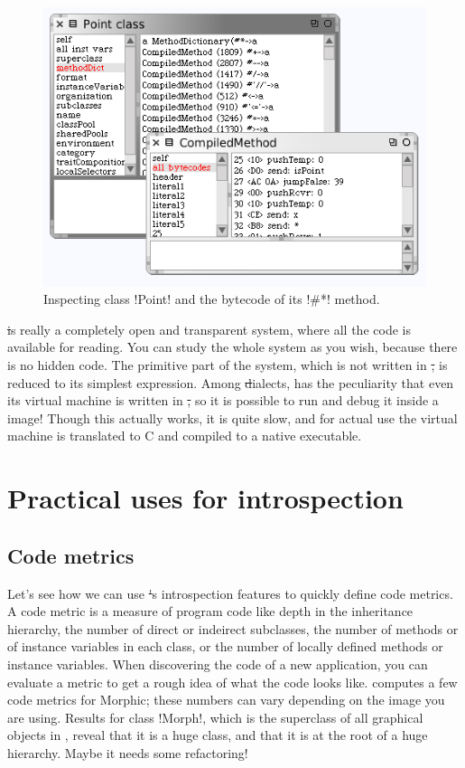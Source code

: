 \documentclass[a4paper,10pt,twoside]{book}
\begin{document}
\begin{figure}[ht]\centering
	\includegraphics[width=.75\linewidth]{CompiledMethod}
	\caption{Inspecting class \ct!Point! and the bytecode of its \ct!\#*! method.\label{fig:CompiledMethod}}
\end{figure}

\st is really a completely open and transparent system, where all the code is available for reading.
You can study the whole system as you wish, because there is no hidden code.
The primitive part of the system, \ie which is not written in \st, is reduced to its simplest expression.
Among \st dialects, \squeak has the peculiarity that even its virtual machine is written in \st, so it is possible to run and debug it inside a \squeak image!
Though this actually works, it is quite slow, and for actual use the virtual machine is translated to C and compiled to a native executable.


\section{Practical uses for introspection} %

\subsection{Code metrics}

Let's see how we can use \st's introspection features to quickly define code metrics.
A code metric is a measure of program code like depth in the inheritance hierarchy, the number of direct or indeirect subclasses, the number of methods or of instance variables in each class, or the number of locally defined methods or instance variables.
When discovering the code of a new application, you can evaluate a metric to get a rough idea of what the code looks like.
 computes a few code metrics for Morphic; these numbers can vary depending on the image you are using.
Results for class \ct!Morph!, which is the superclass of all graphical objects in \squeak, reveal that it is a huge class, and that it is at the root of a huge hierarchy. Maybe it needs some refactoring!
\end{document}

